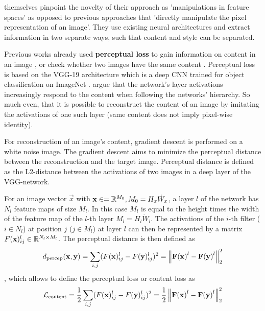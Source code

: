 \citeauthor*{gatys} themselves pinpoint the novelty of their approach as 'manipulations in feature spaces' as opposed to previous approaches that 'directly manipulate the pixel representation of an image'\cite{gatys}.
They use existing neural architectures and extract information in two separate ways, such that content and style can be separated.

Previous works already used \textbf{perceptual loss} to gain information on content in an image \cite{percep_loss}, or check whether two images have the same content \cite{other_percep_loss}.
Perceptual loss is based on the VGG-19 architecture \cite{VGG} which is a deep CNN trained for object classification on ImageNet \cite{imagenet}.
\citeauthor*{gatys} argue that the network's layer activations increasingly respond to the content when following the networks' hierarchy.
So much even, that it is possible to reconstruct the content of an image by imitating the activations of one such layer (same content does not imply pixel-wise identity).

For reconstruction of an image's content, gradient descent is performed on a white noise image.
The gradient descent aims to minimize the perceptual distance between the reconstruction and the target image.
Perceptual distance is defined as the L2-distance between the activations of two images in a deep layer of the VGG-network.

For an image vector $\vec{x}$ with $\mathbf{x} \in = \mathbb{R}^{M_0}, M_0 = H_x \dot W_x $, a layer $l$ of the network has $N_l$ feature maps of size $M_l$.
In this case $M_l$ is equal to the height times the width of the feature map of the $l$-th layer  $M_l = H_l \dot W_l $.
The activations of the $i$-th filter ($i \in N_l$) at position $j$ ($j \in M_l$) at layer $l$ can then be represented by a matrix $F(\mathbf{x})_{ij}^l \in \mathbb{R}^{N_l \times M_l}$.
The perceptual distance is then defined as
\begin{align}
    d_{\text{percep}}(\mathbf{x}, \mathbf{y}) = \sum_{i, j} (F(\mathbf{x})_{ij}^l - F(\mathbf{y})_{ij}^l)^2 = \left\lVert\mathbf{F(\mathbf{x})}^l - \mathbf{F(\mathbf{y})}^l\right\rVert_2^2
\end{align}
, which allows to define the perceptual loss or content loss as 
\begin{align}
    \mathcal{L}_{\text{content}} = \frac{1}{2} \sum_{i, j} (F(\mathbf{x})_{ij}^l - F(\mathbf{y})_{ij}^l)^2 = \frac{1}{2} \left\lVert\mathbf{F(\mathbf{x})}^l - \mathbf{F(\mathbf{y})}^l\right\rVert_2^2
\end{align}

